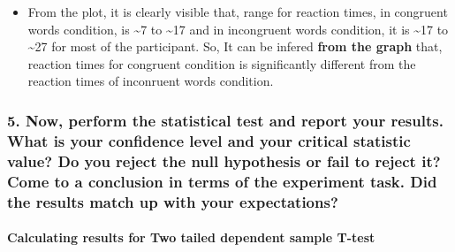\documentclass[11pt]{article}
\providecommand{\tightlist}{%
      \setlength{\itemsep}{0pt}\setlength{\parskip}{0pt}}
\begin{document}
    \begin{itemize}
\tightlist
\item
  From the plot, it is clearly visible that, range for reaction times,
  in congruent words condition, is \textasciitilde{}7 to
  \textasciitilde{}17 and in incongruent words condition, it is
  \textasciitilde{}17 to \textasciitilde{}27 for most of the
  participant. So, It can be infered \textbf{from the graph} that,
  reaction times for congruent condition is significantly different from
  the reaction times of inconruent words condition.
\end{itemize}

    \subsubsection{5. Now, perform the statistical test and report your
results. What is your confidence level and your critical statistic
value? Do you reject the null hypothesis or fail to reject it? Come to a
conclusion in terms of the experiment task. Did the results match up
with your
expectations?}\label{now-perform-the-statistical-test-and-report-your-results.-what-is-your-confidence-level-and-your-critical-statistic-value-do-you-reject-the-null-hypothesis-or-fail-to-reject-it-come-to-a-conclusion-in-terms-of-the-experiment-task.-did-the-results-match-up-with-your-expectations}

    \paragraph{Calculating results for Two tailed dependent sample
T-test}\label{calculating-results-for-two-tailed-dependent-sample-t-test}
\end{document}
